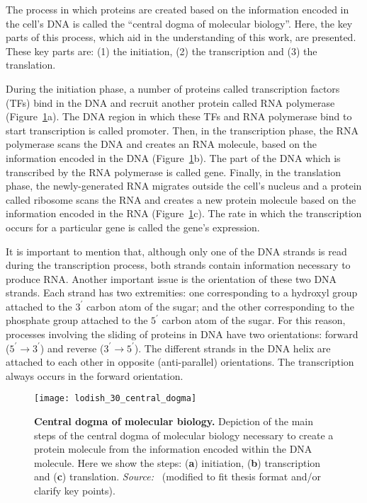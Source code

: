 The process in which proteins are created based on the information encoded in the cell's DNA is called the ``central dogma of molecular biology''. Here, the key parts of this process, which aid in the understanding of this work, are presented. These key parts are: (1) the initiation, (2) the transcription and (3) the translation.

During the initiation phase, a number of proteins called transcription factors (TFs) bind in the DNA and recruit another protein called RNA polymerase (Figure~\ref{fig:lodish_central_dogma}a). The DNA region in which these TFs and RNA polymerase bind to start transcription is called promoter. Then, in the transcription phase, the RNA polymerase scans the DNA and creates an RNA molecule, based on the information encoded in the DNA (Figure~\ref{fig:lodish_central_dogma}b). The part of the DNA which is transcribed by the RNA polymerase is called gene. Finally, in the translation phase, the newly-generated RNA migrates outside the cell's nucleus and a protein called ribosome scans the RNA and creates a new protein molecule based on the information encoded in the RNA (Figure~\ref{fig:lodish_central_dogma}c). The rate in which the transcription occurs for a particular gene is called the gene's expression.

It is important to mention that, although only one of the DNA strands is read during the transcription process, both strands contain information necessary to produce RNA. Another important issue is the orientation of these two DNA strands. Each strand has two extremities: one corresponding to a hydroxyl group attached to the $3^\prime$ carbon atom of the sugar; and the other corresponding to the phosphate group attached to the $5^\prime$ carbon atom of the sugar. For this reason, processes involving the sliding of proteins in DNA have two orientations: forward ($5^\prime \rightarrow 3^\prime$) and reverse ($3^\prime \rightarrow 5^\prime$). The different strands in the DNA helix are attached to each other in opposite (anti-parallel) orientations. The transcription always occurs in the forward orientation.

\begin{figure}[h!]
\centering
\texttt{[image: lodish\_30\_central\_dogma]}
\caption[Central dogma of molecular biology]{\textbf{Central dogma of molecular biology.} Depiction of the main steps of the central dogma of molecular biology necessary to create a protein molecule from the information encoded within the DNA molecule. Here we show the steps: (\textbf{a}) initiation, (\textbf{b}) transcription and (\textbf{c}) translation. \emph{Source:~\cite{lodish2007}} (modified to fit thesis format and/or clarify key points).}
\label{fig:lodish_central_dogma}
\end{figure}

